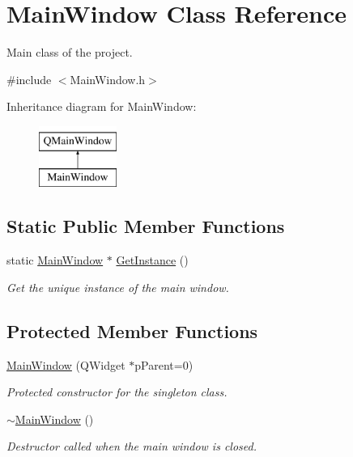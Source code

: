 \hypertarget{class_main_window}{\section{Main\+Window Class Reference}
\label{class_main_window}
}


Main class of the project.  




{\ttfamily \#include $<$Main\+Window.\+h$>$}

Inheritance diagram for Main\+Window\+:\begin{figure}[H]
\begin{center}
\leavevmode
\includegraphics[height=2.000000cm]{class_main_window}
\end{center}
\end{figure}
\subsection*{Static Public Member Functions}
\begin{DoxyCompactItemize}
\item 
static \hyperlink{class_main_window}{Main\+Window} $\ast$ \hyperlink{class_main_window_a5c4a21d2ec29ce94690aa0a118a92200}{Get\+Instance} ()
\begin{DoxyCompactList}\small\item\em Get the unique instance of the main window. \end{DoxyCompactList}\end{DoxyCompactItemize}
\subsection*{Protected Member Functions}
\begin{DoxyCompactItemize}
\item 
\hyperlink{class_main_window_a8bbff0eecf9facda1cfc7a45debd0f2c}{Main\+Window} (Q\+Widget $\ast$p\+Parent=0)
\begin{DoxyCompactList}\small\item\em Protected constructor for the singleton class. \end{DoxyCompactList}\item 
\hyperlink{class_main_window_ae98d00a93bc118200eeef9f9bba1dba7}{$\sim$\+Main\+Window} ()
\begin{DoxyCompactList}\small\item\em Destructor called when the main window is closed. \end{DoxyCompactList}\end{DoxyCompactItemize}
